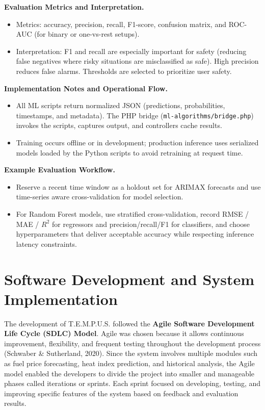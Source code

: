 \documentclass[12pt]{article}
\begin{document}
\noindent\textbf{Evaluation Metrics and Interpretation.}
\begin{itemize}
    \item Metrics: accuracy, precision, recall, F1-score, confusion matrix, and ROC-AUC (for binary or one-vs-rest setups).
    \item Interpretation: F1 and recall are especially important for safety (reducing false negatives where risky situations are misclassified as safe). High precision reduces false alarms. Thresholds are selected to prioritize user safety.
\end{itemize}

\noindent\textbf{Implementation Notes and Operational Flow.}
\begin{itemize}
    \item All ML scripts return normalized JSON (predictions, probabilities, timestamps, and metadata). The PHP bridge (\texttt{ml-algorithms/bridge.php}) invokes the scripts, captures output, and controllers cache results.
    \item Training occurs offline or in development; production inference uses serialized models loaded by the Python scripts to avoid retraining at request time.
\end{itemize}

\noindent\textbf{Example Evaluation Workflow.}
\begin{itemize}
    \item Reserve a recent time window as a holdout set for ARIMAX forecasts and use time-series aware cross-validation for model selection.
    \item For Random Forest models, use stratified cross-validation, record RMSE / MAE / $R^2$ for regressors and precision/recall/F1 for classifiers, and choose hyperparameters that deliver acceptable accuracy while respecting inference latency constraints.
\end{itemize}

\section{Software Development and System Implementation}

The development of T.E.M.P.U.S. followed the \textbf{Agile Software Development Life Cycle (SDLC) Model}. Agile was chosen because it allows continuous improvement, flexibility, and frequent testing throughout the development process (Schwaber \& Sutherland, 2020). Since the system involves multiple modules such as fuel price forecasting, heat index prediction, and historical analysis, the Agile model enabled the developers to divide the project into smaller and manageable phases called iterations or sprints. Each sprint focused on developing, testing, and improving specific features of the system based on feedback and evaluation results.
\end{document}
